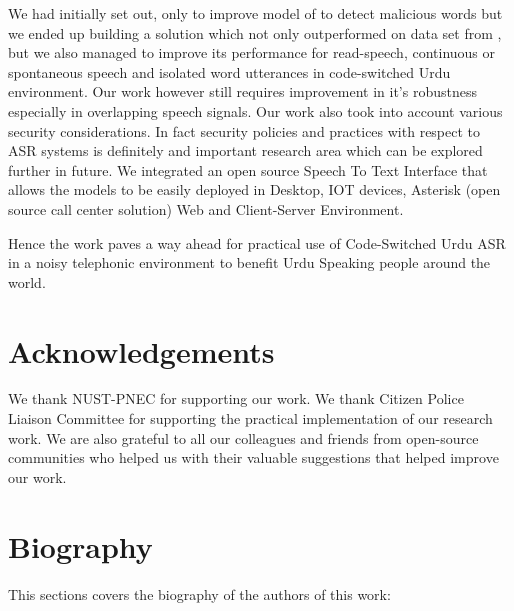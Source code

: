 \documentclass[3p,times]{elsarticle}
\begin{document}
We had initially set out, only to improve model of \cite{sehar_gul_detecting_2020} to detect malicious words but we ended up building a solution which not only outperformed on data set from \cite{sehar_gul_detecting_2020,ali_automatic_2015,qureshi_urdu_2021}, but we also managed to improve its performance for read-speech, continuous or spontaneous speech and isolated word utterances in code-switched Urdu environment. Our work however still requires improvement in it's robustness especially in overlapping speech signals. Our work also took into account various security considerations. In fact security policies and practices with respect to ASR systems is definitely and important research area which can be explored further in future. We integrated an open source Speech To Text Interface that allows the models to be easily deployed in Desktop, IOT devices, Asterisk (open source call center solution) Web and Client-Server Environment. 

Hence the work paves a way ahead for practical use of Code-Switched Urdu ASR in a noisy telephonic environment to benefit Urdu Speaking people around the world.

\section{Acknowledgements}
We thank NUST-PNEC for supporting our work. We thank Citizen Police Liaison Committee for supporting the practical implementation of our research work. We are also grateful to all our colleagues and friends from open-source communities who helped us with their valuable suggestions that helped improve our work.



\newpage

\section*{Biography}
This sections covers the biography of the authors of this work:
 
\end{document}
